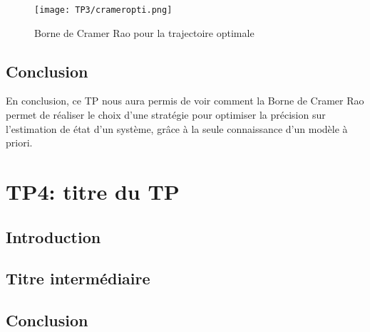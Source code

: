 \documentclass{article}
\begin{document}
\begin{figure}
  \centering
  \texttt{[image: TP3/crameropti.png]}
  \label{crameropti}
  \caption{Borne de Cramer Rao pour la trajectoire optimale}
\end{figure}

\subsection{Conclusion}
En conclusion, ce TP nous aura permis de voir comment la Borne de Cramer Rao permet de réaliser le choix d'une stratégie pour 
optimiser la précision sur l'estimation de état d'un système, grâce à la seule connaissance d'un modèle à priori.

\newpage

\section{TP4: titre du TP}
\subsection{Introduction}

\subsection{Titre intermédiaire}

\subsection{Conclusion}
\end{document}
